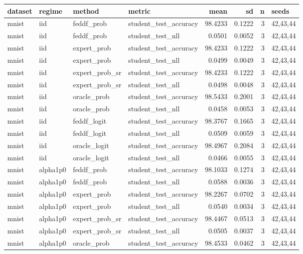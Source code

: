 \begin{tabular}{llllrrrl}
\toprule
dataset & regime & method & metric & mean & sd & n & seeds \\
\midrule
mnist & iid & feddf\_prob & student\_test\_accuracy & 98.4233 & 0.1222 & 3 & 42,43,44 \\
mnist & iid & feddf\_prob & student\_test\_nll & 0.0501 & 0.0052 & 3 & 42,43,44 \\
mnist & iid & expert\_prob & student\_test\_accuracy & 98.4233 & 0.1222 & 3 & 42,43,44 \\
mnist & iid & expert\_prob & student\_test\_nll & 0.0499 & 0.0049 & 3 & 42,43,44 \\
mnist & iid & expert\_prob\_sr & student\_test\_accuracy & 98.4233 & 0.1222 & 3 & 42,43,44 \\
mnist & iid & expert\_prob\_sr & student\_test\_nll & 0.0498 & 0.0048 & 3 & 42,43,44 \\
mnist & iid & oracle\_prob & student\_test\_accuracy & 98.5433 & 0.2001 & 3 & 42,43,44 \\
mnist & iid & oracle\_prob & student\_test\_nll & 0.0458 & 0.0053 & 3 & 42,43,44 \\
mnist & iid & feddf\_logit & student\_test\_accuracy & 98.3767 & 0.1665 & 3 & 42,43,44 \\
mnist & iid & feddf\_logit & student\_test\_nll & 0.0509 & 0.0059 & 3 & 42,43,44 \\
mnist & iid & oracle\_logit & student\_test\_accuracy & 98.4967 & 0.2084 & 3 & 42,43,44 \\
mnist & iid & oracle\_logit & student\_test\_nll & 0.0466 & 0.0055 & 3 & 42,43,44 \\
mnist & alpha1p0 & feddf\_prob & student\_test\_accuracy & 98.1033 & 0.1274 & 3 & 42,43,44 \\
mnist & alpha1p0 & feddf\_prob & student\_test\_nll & 0.0588 & 0.0036 & 3 & 42,43,44 \\
mnist & alpha1p0 & expert\_prob & student\_test\_accuracy & 98.2267 & 0.0702 & 3 & 42,43,44 \\
mnist & alpha1p0 & expert\_prob & student\_test\_nll & 0.0540 & 0.0034 & 3 & 42,43,44 \\
mnist & alpha1p0 & expert\_prob\_sr & student\_test\_accuracy & 98.4467 & 0.0513 & 3 & 42,43,44 \\
mnist & alpha1p0 & expert\_prob\_sr & student\_test\_nll & 0.0505 & 0.0037 & 3 & 42,43,44 \\
mnist & alpha1p0 & oracle\_prob & student\_test\_accuracy & 98.4533 & 0.0462 & 3 & 42,43,44 \\

\end{tabular}
